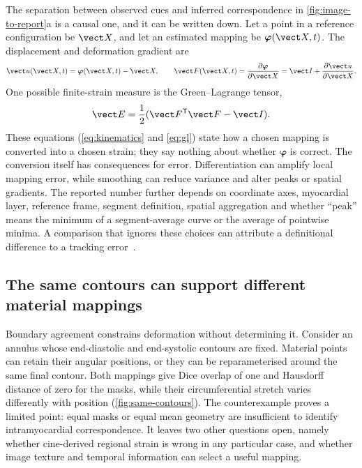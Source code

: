 The separation between observed cues and inferred correspondence in \cref{fig:image-to-report}a is a causal one, and it can be written down. Let a point in a reference configuration be \(\vect X\), and let an estimated mapping be \(\boldsymbol\varphi(\vect X,t)\). The displacement and deformation gradient are
\begin{equation}
\vect u(\vect X,t)=\boldsymbol\varphi(\vect X,t)-\vect X,
\qquad
\vect F(\vect X,t)=\frac{\partial\boldsymbol\varphi}{\partial\vect X}
=\vect I+\frac{\partial\vect u}{\partial\vect X}.
\label{eq:kinematics}
\end{equation}
One possible finite-strain measure is the Green--Lagrange tensor,
\begin{equation}
\vect E=\frac{1}{2}(\vect F^{\mathsf T}\vect F-\vect I).
\label{eq:gl}
\end{equation}
These equations (\cref{eq:kinematics} and \cref{eq:gl}) state how a chosen mapping is converted into a chosen strain; they say nothing about whether \(\boldsymbol\varphi\) is correct. The conversion itself has consequences for error. Differentiation can amplify local mapping error, while smoothing can reduce variance and alter peaks or spatial gradients. The reported number further depends on coordinate axes, myocardial layer, reference frame, segment definition, spatial aggregation and whether ``peak'' means the minimum of a segment-average curve or the average of pointwise minima. A comparison that ignores these choices can attribute a definitional difference to a tracking error~\cite{voigt2015,wehner2018}.

\subsection{The same contours can support different material mappings}

Boundary agreement constrains deformation without determining it. Consider an annulus whose end-diastolic and end-systolic contours are fixed. Material points can retain their angular positions, or they can be reparameterised around the same final contour. Both mappings give Dice overlap of one and Hausdorff distance of zero for the masks, while their circumferential stretch varies differently with position (\cref{fig:same-contours}). The counterexample proves a limited point: equal masks or equal mean geometry are insufficient to identify intramyocardial correspondence. It leaves two other questions open, namely whether cine-derived regional strain is wrong in any particular case, and whether image texture and temporal information can select a useful mapping.

